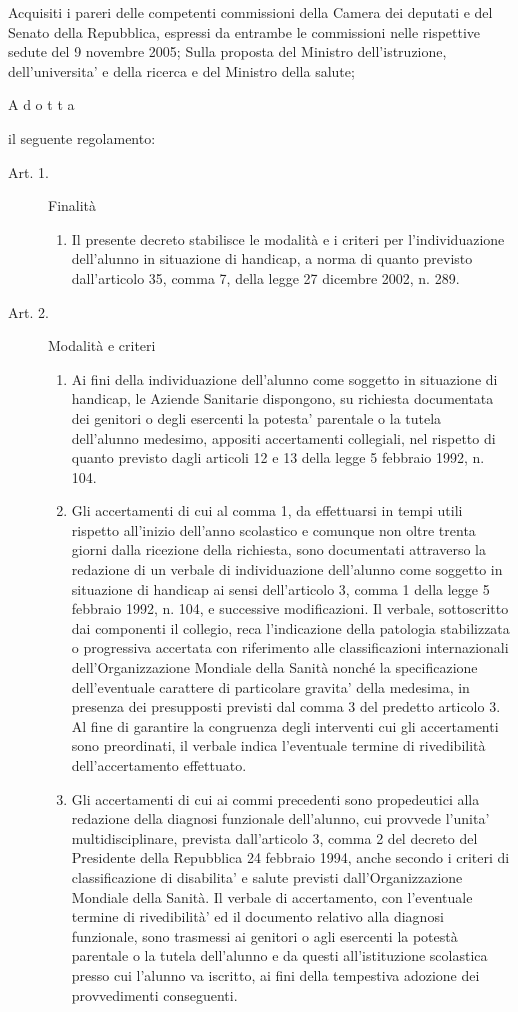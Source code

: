 Acquisiti i pareri delle competenti commissioni della Camera dei deputati e del Senato della Repubblica, espressi da entrambe le commissioni nelle rispettive sedute del 9 novembre 2005;
Sulla proposta del Ministro dell'istruzione, dell'universita' e della ricerca e del Ministro della salute;
\begin{center}
A d o t t a
\end{center}
il seguente regolamento:
\begin{description}
	\item[Art. 1.] Finalità
	\begin{enumerate}
		\item Il presente decreto stabilisce le modalità e i criteri per l'individuazione dell'alunno in situazione di handicap, a norma di quanto previsto dall'articolo 35, comma 7, della legge 27 dicembre 2002, n. 289.
		\end{enumerate}
	\item [Art. 2.] Modalità e criteri
	\begin{enumerate}
		\item Ai fini della individuazione dell'alunno come soggetto in situazione di handicap, le Aziende Sanitarie dispongono, su richiesta documentata dei genitori o degli esercenti la potesta' parentale o la tutela dell'alunno medesimo, appositi accertamenti collegiali, nel
		rispetto di quanto previsto dagli articoli 12 e 13 della legge 5 febbraio 1992, n. 104.
		\item Gli accertamenti di cui al comma 1, da effettuarsi in tempi utili rispetto all'inizio dell'anno scolastico e comunque non oltre trenta giorni dalla ricezione della richiesta, sono documentati attraverso la redazione di un verbale di individuazione dell'alunno come soggetto in situazione di handicap ai sensi dell'articolo 3, comma 1 della legge 5 febbraio 1992, n. 104, e successive modificazioni. Il verbale, sottoscritto dai componenti il collegio, reca l'indicazione della patologia stabilizzata o progressiva accertata con riferimento alle classificazioni internazionali dell'Organizzazione Mondiale della Sanità nonché la specificazione dell'eventuale carattere di particolare gravita' della medesima, in presenza dei presupposti previsti dal comma 3 del predetto articolo 3. Al fine di garantire la congruenza degli interventi cui gli accertamenti sono preordinati, il verbale indica l'eventuale termine di rivedibilità dell'accertamento effettuato.
		\item Gli accertamenti di cui ai commi precedenti sono propedeutici alla redazione della diagnosi funzionale dell'alunno, cui provvede l'unita' multidisciplinare, prevista dall'articolo 3, comma 2 del decreto del Presidente della Repubblica 24 febbraio 1994, anche secondo i criteri di classificazione di disabilita' e salute previsti dall'Organizzazione Mondiale della Sanità. Il verbale di accertamento, con l'eventuale termine di rivedibilità' ed il documento relativo alla diagnosi funzionale, sono trasmessi ai genitori o agli esercenti la potestà parentale o la tutela dell'alunno e da questi all'istituzione scolastica presso cui l'alunno va iscritto, ai fini della tempestiva adozione dei provvedimenti conseguenti.

\end{enumerate}
\end{description}
